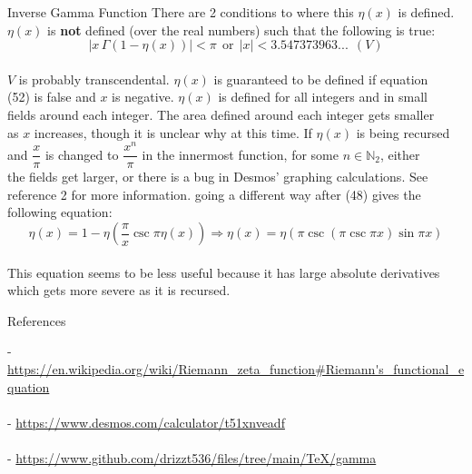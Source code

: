 \documentclass[12pt]{article}
\begin{document}
\begin{section}{Inverse Gamma Function}
	\noindent There are 2 conditions to where this $\eta(x)$ is defined.\\
	$\eta(x)$ is \textbf{not} defined (over the real numbers) such that the following is true:\\
	\begin{equation}
		|x\,\Gamma(1-\eta(x))|<\pi~~\text{or}~~|x|<3.547373963...~~(V)
	\end{equation}\\
	$V$ is probably transcendental. $\eta(x)$ is guaranteed to be defined if equation\\
	(52) is false and $x$ is negative. $\eta(x)$ is defined for all integers and in small\\
	fields around each integer. The area defined around each integer gets smaller\\
	as $x$ increases, though it is unclear why at this time. If $\eta(x)$ is being recursed\\
	and $\dfrac x\pi$ is changed to $\dfrac{x^n}\pi$ in the innermost function, for some $n\in\mathbb N_2$, either\\
	the fields get larger, or there is a bug in Desmos' graphing calculations. See\\
	reference 2 for more information. going a different way after (48) gives the\\
	following equation:\\
	\begin{equation}
		\eta(x)=1-\eta\left(\dfrac\pi x\csc\pi\eta(x)\right)\Longrightarrow\eta(x)=\eta(\pi\csc(\pi\csc\pi x)\sin\pi x)
	\end{equation}\\
	This equation seems to be less useful because it has large absolute derivatives\\
	which gets more severe as it is recursed.
\end{section}

\pagebreak
\begin{section}{References}

	\noindent- \url{https://en.wikipedia.org/wiki/Riemann\_zeta\_function\#Riemann's\_functional\_equation}\\
	\indent{}\\

	\noindent- \url{https://www.desmos.com/calculator/t51xnveadf}\\
	\indent{}\\

	\noindent- \url{https://www.github.com/drizzt536/files/tree/main/TeX/gamma}\\
	\indent{}
\end{section}
\end{document}
